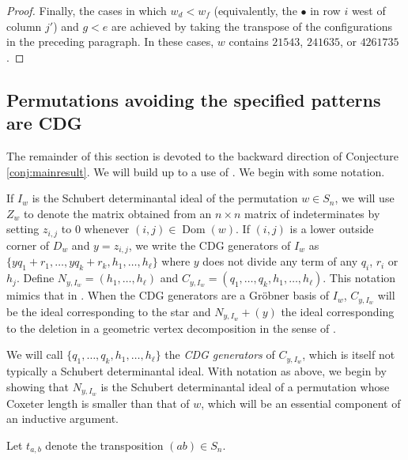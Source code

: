 \documentclass[ALCO,Unicode,published]{cedram}
\DeclareMathOperator{\Dom}{Dom}
\begin{document}
\begin{proof}
Finally, the cases in which $w_d<w_f$ (equivalently, the $\bullet$ in row $i$ west of column $j'$) and $g<e$ are achieved by taking the transpose of the configurations in the preceding paragraph.  In these cases, $w$ contains $21543$, $241635$, or $4261735$.
\end{proof}

\subsection{Permutations avoiding the specified patterns are CDG} \label{subsect:backward} The remainder of this section is devoted to the backward direction of Conjecture \ref{conj:mainresult}.  We will build up to a use of \cite[Corollary 4.13]{KR}.  We begin with some notation.

If $I_w$ is the Schubert determinantal ideal of the permutation $w \in S_n$, we will use $Z_w$ to denote the matrix obtained from an $n \times n$ matrix of indeterminates by setting $z_{i,j}$ to $0$ whenever $(i,j) \in \Dom(w)$.   If $(i,j)$ is a lower outside corner of $D_w$ and $y = z_{i,j}$, we write the CDG generators of $I_w$ as $\{yq_1+r_1, \ldots, yq_k+r_k, h_1, \ldots, h_\ell\}$ where $y$ does not divide any term of any $q_i$, $r_i$ or $h_j$.  Define $N_{y,I_w} = (h_1, \ldots, h_\ell)$ and $C_{y,I_w} = (q_1, \ldots, q_k, h_1, \ldots, h_\ell)$.  This notation mimics that in \cite{KR}.  When the CDG generators are a Gr\"obner basis of $I_w$, $C_{y,I_w}$ will be the ideal corresponding to the star and $N_{y,I_w}+(y)$ the ideal corresponding to the deletion in a geometric vertex decomposition in the sense of \cite{KMY09}.

We will call $\{q_1, \ldots, q_k, h_1, \ldots, h_\ell\}$ the \emph{CDG generators} of $C_{y,I_w}$, which is itself not typically a Schubert determinantal ideal.  With notation as above, we begin by showing that $N_{y,I_w}$ is the Schubert determinantal ideal of a permutation whose Coxeter length is smaller than that of $w$, which will be an essential component of an inductive argument.

Let $t_{a,b}$ denote the transposition $(ab) \in S_n$.
\end{document}

